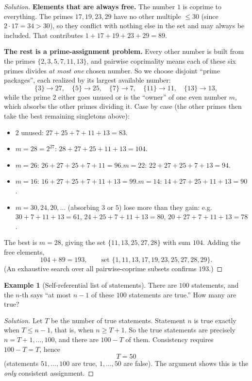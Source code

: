 \documentclass[11pt]{article}
\theoremstyle{definition}
\newtheorem{example}{Example}[section]
\begin{document}
\begin{proof}[Solution]
\textbf{Elements that are always free.} The number $1$ is coprime to everything. The primes $17,19,23,29$ have no other multiple $\le30$ (since $2\cdot17=34>30$), so they conflict with nothing else in the set and may always be included. That contributes $1+17+19+23+29=89$.

\textbf{The rest is a prime-assignment problem.} Every other number is built from the primes $\{2,3,5,7,11,13\}$, and pairwise coprimality means each of these six primes divides \emph{at most one} chosen number. So we choose disjoint ``prime packages'', each realized by its largest available number:
\[
\{3\}\!\to\!27,\quad \{5\}\!\to\!25,\quad \{7\}\!\to\!7,\quad \{11\}\!\to\!11,\quad \{13\}\!\to\!13,
\]
while the prime $2$ either goes unused or is the ``owner'' of one even number $m$, which absorbs the other primes dividing it. Case by case (the other primes then take the best remaining singletons above):
\begin{itemize}
    \item $2$ unused: $27+25+7+11+13=83$.
    \item $m=28=2^27$: $28+27+25+11+13=104$.
    \item $m=26$: $26+27+25+7+11=96$.\quad $m=22$: $22+27+25+7+13=94$.
    \item $m=16$: $16+27+25+7+11+13=99$.\quad $m=14$: $14+27+25+11+13=90$.
    \item $m=30,24,20,\dots$ (absorbing $3$ or $5$) lose more than they gain: e.g.\ $30+7+11+13=61$, $24+25+7+11+13=80$, $20+27+7+11+13=78$.
\end{itemize}
The best is $m=28$, giving the set $\{11,13,25,27,28\}$ with sum $104$. Adding the free elements,
\[
\boxed{104+89=193},\qquad \text{set } \{1,11,13,17,19,23,25,27,28,29\}.
\]
(An exhaustive search over all pairwise-coprime subsets confirms $193$.)
\end{proof}

\begin{example}[Self-referential list of statements]
There are $100$ statements, and the $n$-th says ``at most $n-1$ of these $100$ statements are true.'' How many are true?
\end{example}

\begin{proof}[Solution]
Let $T$ be the number of true statements. Statement $n$ is true exactly when $T\le n-1$, that is, when $n\ge T+1$. So the true statements are precisely $n=T+1,\dots,100$, and there are $100-T$ of them. Consistency requires $100-T=T$, hence
\[
\boxed{T=50}
\]
(statements $51,\dots,100$ are true, $1,\dots,50$ are false). The argument shows this is the \emph{only} consistent assignment.
\end{proof}
\end{document}
